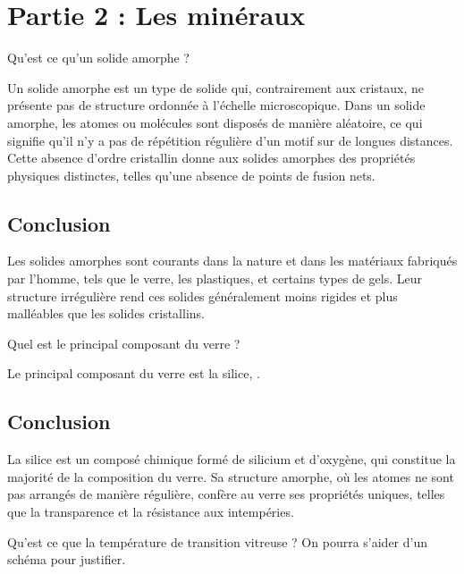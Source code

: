 \documentclass[answers]{exam}
\begin{document}
\section{Partie 2 : Les minéraux}

\begin{questions}

\question[2] Qu'est ce qu'un solide amorphe ?


\begin{solution}
Un solide amorphe est un type de solide qui, contrairement aux cristaux, ne présente pas de structure ordonnée à l'échelle microscopique. Dans un solide amorphe, les atomes ou molécules sont disposés de manière aléatoire, ce qui signifie qu'il n'y a pas de répétition régulière d'un motif sur de longues distances. Cette absence d'ordre cristallin donne aux solides amorphes des propriétés physiques distinctes, telles qu'une absence de points de fusion nets.

\subsection*{Conclusion}

Les solides amorphes sont courants dans la nature et dans les matériaux fabriqués par l'homme, tels que le verre, les plastiques, et certains types de gels. Leur structure irrégulière rend ces solides généralement moins rigides et plus malléables que les solides cristallins.
\end{solution}

\question[2] Quel est le principal composant du verre ? 


\begin{solution}
Le principal composant du verre est la silice, .  

\subsection*{Conclusion}

La silice est un composé chimique formé de silicium et d'oxygène, qui constitue la majorité de la composition du verre. Sa structure amorphe, où les atomes ne sont pas arrangés de manière régulière, confère au verre ses propriétés uniques, telles que la transparence et la résistance aux intempéries.
\end{solution}

\question[1] Qu'est ce que la température de transition vitreuse ? On pourra s'aider d'un schéma pour justifier. 



\end{questions}
\end{document}
